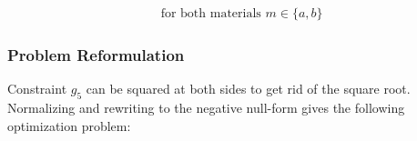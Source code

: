 \begin{table}[H]
\end{table}
\vspace{-8mm}
\begin{align*}
	& \text{for both materials } m \in \{a, b\} \nonumber 
\end{align*}


\subsubsection{Problem Reformulation}
Constraint $g_5$ can be squared at both sides to get rid of the square root. 
Normalizing and rewriting to the negative null-form gives the following optimization problem:


